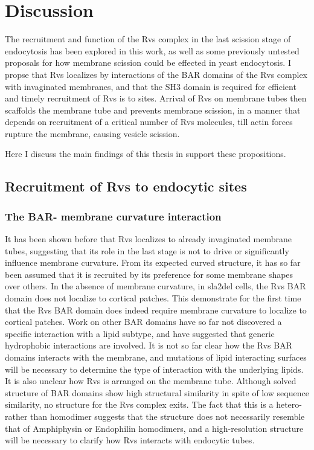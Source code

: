 
\chapter{Discussion}    
\label{Ch:discussion}
The recruitment and function of the Rvs complex in the last scission stage of endocytosis has been explored in this work, as well as some previously untested proposals for how membrane scission could be effected in yeast endocytosis. 
I propse that Rvs localizes by interactions of the BAR domains of the Rvs complex with invaginated membranes, and that the SH3 domain is required for efficient and timely recruitment of Rvs is to sites. Arrival of Rvs on membrane tubes then scaffolds the membrane tube and prevents membrane scission, in a manner that depends on recruitment of a critical number of Rvs molecules, till actin forces rupture the membrane, causing vesicle scission. 

Here I discuss the main findings of this thesis in support these propositions.

\section{Recruitment of Rvs to endocytic sites}

\subsection{The BAR- membrane curvature interaction}

It has been shown before that Rvs localizes to already invaginated membrane tubes, suggesting that its role in the last stage is not to drive or significantly influence membrane curvature. From its expected curved structure, it has so far been assumed that it is recruited by its preference for some membrane shapes over others. In the absence of membrane curvature, in sla2del cells, the Rvs BAR domain does not localize to cortical patches. This demonstrate for the first time that the Rvs BAR domain does indeed require membrane curvature to localize to cortical patches. Work on other BAR domains have so far not discovered a specific interaction with a lipid subtype, and have suggested that generic hydrophobic interactions are involved. It is not so far clear how the Rvs BAR domains interacts with the membrane, and mutations of lipid interacting surfaces will be necessary to determine the type of interaction with the underlying lipids. It is also unclear how Rvs is arranged on the membrane tube. Although solved structure of BAR domains show high structural similarity in spite of low sequence similarity, no structure for the Rvs complex exits. The fact that this is a hetero- rather than homodimer suggests that the structure does not necessarily resemble that of Amphiphysin or Endophilin homodimers, and a high-resolution structure will be necessary to clarify how Rvs interacts with endocytic tubes. 

